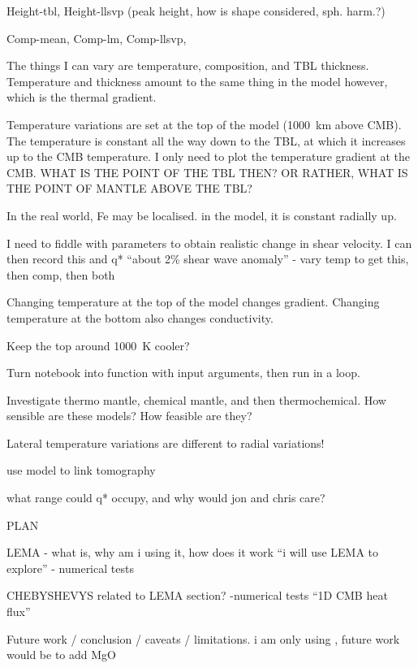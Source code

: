 Height-tbl,
Height-llsvp (peak height, how is shape considered, sph. harm.?)

Comp-mean,
Comp-lm,
Comp-llsvp,


The things I can vary are temperature, composition, and TBL thickness. Temperature and thickness amount to the same thing in the model however, which is the thermal gradient.

Temperature variations are set at the top of the model (1000~km above CMB). The temperature is constant all the way down to the TBL, at which it increases up to the CMB temperature. I only need to plot the temperature gradient at the CMB. WHAT IS THE POINT OF THE TBL THEN? OR RATHER, WHAT IS THE POINT OF MANTLE ABOVE THE TBL?

In the real world, Fe may be localised. in the model, it is constant radially up. 

I need to fiddle with parameters to obtain realistic change in shear velocity. I can then record this and q* ``about 2\% shear wave anomaly'' - vary temp to get this, then comp, then both

Changing temperature at the top of the model changes gradient. Changing temperature at the bottom also changes conductivity.

Keep the top around 1000~K cooler?

Turn notebook into function with input arguments, then run in a loop.

Investigate thermo mantle, chemical mantle, and then thermochemical. How sensible are these models? How feasible are they?

Lateral temperature variations are different to radial variations!

use model to link tomography

what range could q* occupy, and why would jon and chris care?




PLAN


LEMA - what is, why am i using it, how does it work ``i will use LEMA to explore'' - numerical tests

CHEBYSHEVYS related to LEMA section? -numerical tests ``1D CMB heat flux''

Future work / conclusion / caveats / limitations. i am only using \bdg, future work would be to add MgO
















